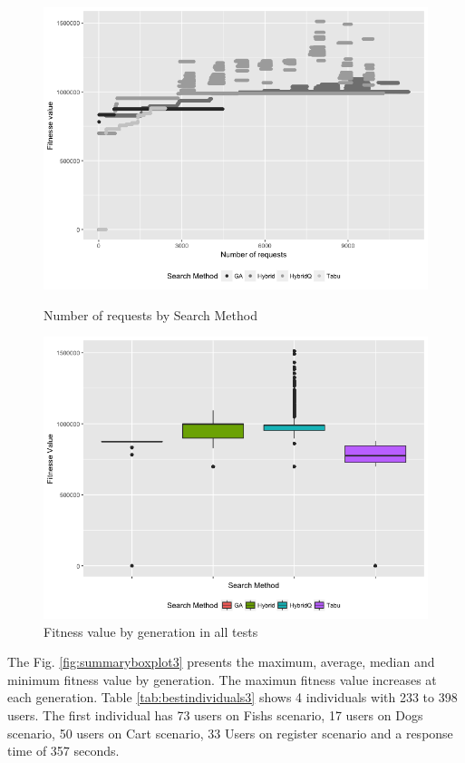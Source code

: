 \begin{figure}[h]
\begin{minipage}{.5\textwidth}
\centering
\includegraphics[width=1\textwidth]{./images/experiment3-3.png}
\caption{Number of requests by Search Method}
\label{fig:numberofrequestsbysearchmethod3}
\end{minipage}
\begin{minipage}{.5\textwidth}
\centering
\includegraphics[width=1\textwidth]{./images/experiment3-4.png}
\caption{Fitness value by generation in all tests}
\label{fig:boxplot3}
\end{minipage}

\end{figure}

The Fig. \ref{fig:summaryboxplot3} presents the maximum, average, median and minimum fitness value by generation. The maximun fitness value increases at each generation. Table \ref{tab:bestindividuals3} shows 4 individuals with 233 to 398 users.  The first individual has 73 users on Fishs scenario, 17 users on Dogs scenario, 50 users on Cart scenario, 33 Users on register scenario  and a response time of 357 seconds. 

